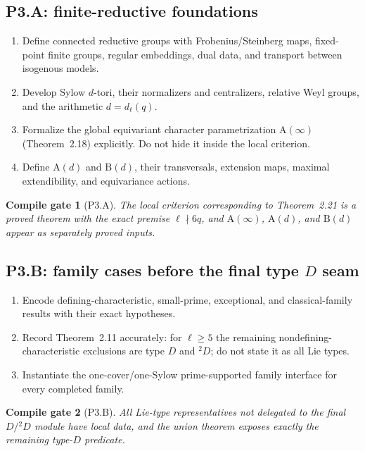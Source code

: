 \documentclass[11pt]{article}
\newtheorem{gate}{Compile gate}
\begin{document}
\subsection{P3.A: finite-reductive foundations}

\begin{enumerate}[label=\textbf{P3.A\arabic*.},leftmargin=*]
  \item Define connected reductive groups with Frobenius/Steinberg maps,
  fixed-point finite groups, regular embeddings, dual data, and transport
  between isogenous models.
  \item Develop Sylow \(d\)-tori, their normalizers and centralizers,
  relative Weyl groups, and the arithmetic \(d=d_\ell(q)\).
  \item Formalize the global equivariant character parametrization
  \(\mathrm A(\infty)\) (Theorem~2.18) explicitly.  Do not hide it inside
  the local criterion.
  \item Define \(\mathrm A(d)\) and \(\mathrm B(d)\), their transversals,
  extension maps, maximal extendibility, and equivariance actions.
\end{enumerate}

\begin{gate}[P3.A]
The local criterion corresponding to Theorem~2.21 is a proved theorem with
the exact premise \(\ell\nmid 6q\), and \(\mathrm A(\infty)\),
\(\mathrm A(d)\), and \(\mathrm B(d)\) appear as separately proved inputs.
\end{gate}

\subsection{P3.B: family cases before the final type \(D\) seam}

\begin{enumerate}[label=\textbf{P3.B\arabic*.},leftmargin=*]
  \item Encode defining-characteristic, small-prime, exceptional, and
  classical-family results with their exact hypotheses.
  \item Record Theorem~2.11 accurately: for \(\ell\geq5\) the remaining
  nondefining-characteristic exclusions are type \(D\) and
  \({}^{2}D\); do not state it as all Lie types.
  \item Instantiate the one-cover/one-Sylow prime-supported family
  interface for every completed family.
\end{enumerate}

\begin{gate}[P3.B]
All Lie-type representatives not delegated to the final \(D/{}^2D\)
module have local data, and the union theorem exposes exactly the remaining
type-\(D\) predicate.
\end{gate}
\end{document}
